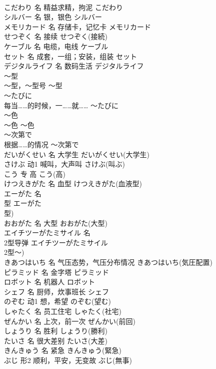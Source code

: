 \documentclass[8pt]{extreport}
\begin{document}
\begin{CJK}{UTF8}{min}
\\	こだわり	名	精益求精，拘泥	こだわり	
\\	シルバー	名	银，银色	シルバー	
\\	メモリカード	名	存储卡，记忆卡	メモリカード	
\\	せつぞく	名	接续	せつぞく(接続)	
\\	ケーブル	名	电缆，电线	ケーブル	
\\	セット	名	成套，一组；安装，组装	セット	
\\	デジタルライフ	名	数码生活	デジタルライフ	
\\	～型	
\\	～型，～型号	～型	
\\	～たびに	
\\	每当……的时候，一……就……	～たびに	
\\	～色	
\\	～色	～色	
\\	～次第で	
\\	根据……的情况	～次第で	
\\	だいがくせい	名	大学生	だいがくせい(大学生)	
\\	さけぶ	动1	喊叫，大声叫	さけぶ(叫ぶ)	
\\	こう	专	高	こう(高)	
\\	けつえきがた	名	血型	けつえきがた(血液型)	
\\	エーがた	名	
\\	型	エーがた
\\	型)	
\\	おおがた	名	大型	おおがた(大型)	
\\	エイチツーがたミサイル	名	
\\	2型导弹	エイチツーがたミサイル
\\	2型～)	
\\	きあつはいち	名	气压态势，气压分布情况	きあつはいち(気圧配置)	
\\	ピラミッド	名	金字塔	ピラミッド	
\\	ロボット	名	机器人	ロボット	
\\	シェフ	名	厨师，炊事班长	シェフ	
\\	のぞむ	动1	想，希望	のぞむ(望む)	
\\	しゃたく	名	员工住宅	しゃたく(社宅)	
\\	ぜんかい	名	上次，前一次	ぜんかい(前回)	
\\	しょうり	名	胜利	しょうり(勝利)	
\\	たいさ	名	很大差别	たいさ(大差)	
\\	きんきゅう	名	紧急	きんきゅう(緊急)	
\\	ぶじ	形2	顺利，平安，无变故	ぶじ(無事)	

\end{CJK}
\end{document}
